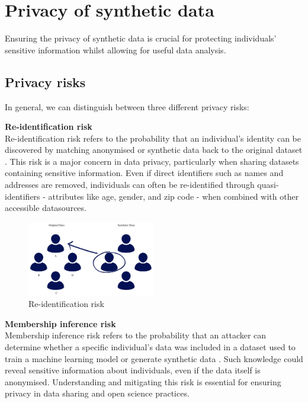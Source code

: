 


\section{Privacy of synthetic data}

Ensuring the privacy of synthetic data is crucial for protecting individuals' sensitive information whilst allowing for useful data analysis.

\subsection{Privacy risks}

In general, we can distinguish between three different privacy risks:

\textbf{Re-identification risk} \\
Re-identification risk refers to the probability that an individual's identity can be discovered by matching anonymised or synthetic data back to the original dataset \cite{ochoa2001reidentification,el2008protecting}. This risk is a major concern in data privacy, particularly when sharing datasets containing sensitive information. Even if direct identifiers such as names and addresses are removed, individuals can often be re-identified through quasi-identifiers - attributes like age, gender, and zip code - when combined with other accessible datasources. 

\vspace{10pt}
\begin{figure}[H]
    \centering
    \includegraphics[width=0.5\textwidth]{Images/Reidentificationrisk.png}
    \caption{Re-identification risk}
    \label{fig:synthesis_1}
\end{figure}
\vspace{10pt}

\textbf{Membership inference risk} \\
Membership inference risk refers to the probability that an attacker can determine whether a specific individual's data was included in a dataset used to train a machine learning model or generate synthetic data \cite{hyeong2022empirical}. Such knowledge could reveal sensitive information about individuals, even if the data itself is anonymised. Understanding and mitigating this risk is essential for ensuring privacy in data sharing and open science practices.

